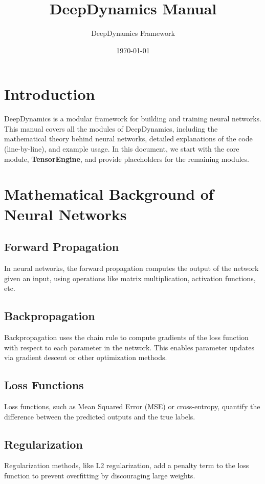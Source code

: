 \documentclass[11pt]{article}
\title{DeepDynamics Manual}
\author{DeepDynamics Framework}
\date{\today}
\begin{document}
\maketitle

\tableofcontents

\newpage

\section{Introduction}
DeepDynamics is a modular framework for building and training neural networks. This manual covers all the modules of DeepDynamics, including the mathematical theory behind neural networks, detailed explanations of the code (line-by-line), and example usage. In this document, we start with the core module, \textbf{TensorEngine}, and provide placeholders for the remaining modules.

\section{Mathematical Background of Neural Networks}
\subsection{Forward Propagation}
In neural networks, the forward propagation computes the output of the network given an input, using operations like matrix multiplication, activation functions, etc.

\subsection{Backpropagation}
Backpropagation uses the chain rule to compute gradients of the loss function with respect to each parameter in the network. This enables parameter updates via gradient descent or other optimization methods.

\subsection{Loss Functions}
Loss functions, such as Mean Squared Error (MSE) or cross-entropy, quantify the difference between the predicted outputs and the true labels.

\subsection{Regularization}
Regularization methods, like L2 regularization, add a penalty term to the loss function to prevent overfitting by discouraging large weights.
\end{document}
